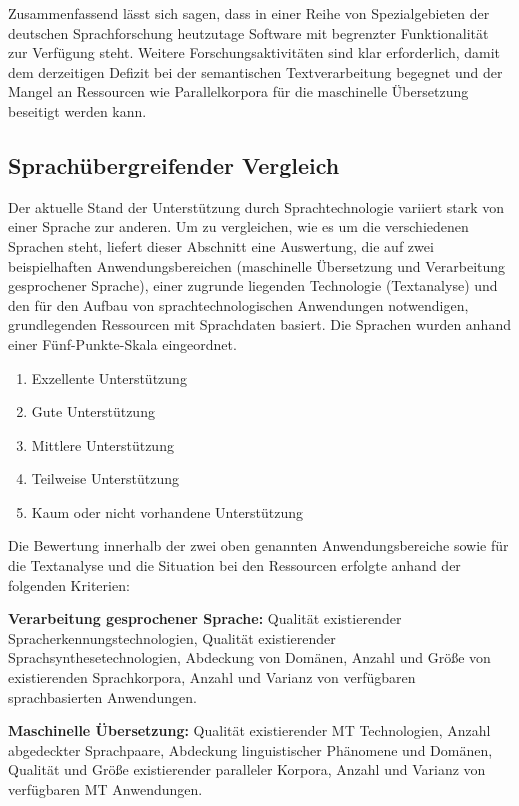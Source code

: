 \begin{multicols}{2}
Zusammenfassend lässt sich sagen, dass in einer Reihe von Spezialgebieten der deutschen Sprachforschung heutzutage Software mit begrenzter Funktionalität zur Verfügung steht. Weitere Forschungsaktivitäten sind klar erforderlich, damit dem derzeitigen Defizit bei der semantischen Textverarbeitung begegnet und der Mangel an Ressourcen wie Parallelkorpora für die maschinelle Übersetzung beseitigt werden kann.

\subsection{Sprachübergreifender Vergleich}

Der aktuelle Stand der Unterstützung durch Sprachtechnologie variiert stark von einer Sprache zur anderen. Um zu vergleichen, wie es um die verschiedenen Sprachen steht, liefert dieser Abschnitt eine Auswertung, die auf zwei beispielhaften Anwendungsbereichen (maschinelle Übersetzung und Verarbeitung gesprochener Sprache), einer zugrunde liegenden Technologie (Textanalyse) und den für den Aufbau von sprachtechnologischen Anwendungen notwendigen, grundlegenden Ressourcen mit Sprachdaten basiert. Die Sprachen wurden anhand einer Fünf-Punkte-Skala eingeordnet.

\begin{enumerate}
\item Exzellente Unterstützung
\item Gute Unterstützung
\item Mittlere Unterstützung
\item Teilweise Unterstützung
\item Kaum oder nicht vorhandene Unterstützung
\end{enumerate}

Die Bewertung innerhalb der zwei oben genannten Anwendungsbereiche sowie für die Textanalyse und die Situation bei den Ressourcen erfolgte anhand der folgenden Kriterien:

\textbf{Verarbeitung gesprochener Sprache:} Qualität existierender Spracherkennungstechnologien, Qualität existierender Sprachsynthesetechnologien, Abdeckung von Domänen, Anzahl und Größe von existierenden Sprachkorpora, Anzahl und Varianz von verfügbaren sprachbasierten Anwendungen.

\textbf{Maschinelle Übersetzung:} Qualität existierender MT Technologien, Anzahl abgedeckter Sprachpaare, Abdeckung linguistischer Phänomene und Domänen, Qualität und Größe existierender paralleler Korpora, Anzahl und Varianz von verfügbaren MT Anwendungen.


\end{multicols}
